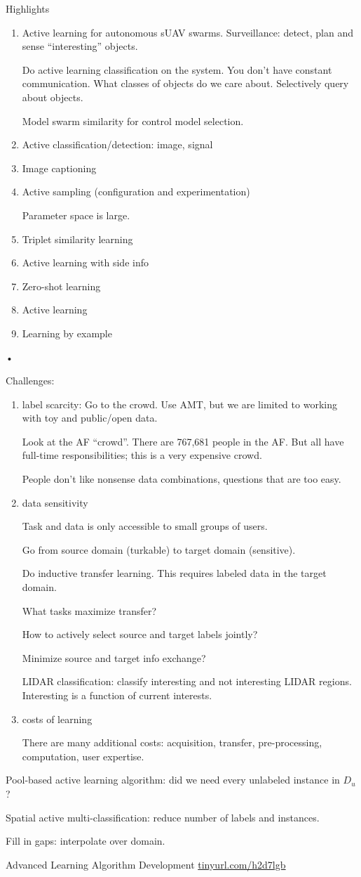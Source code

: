 Highlights
\begin{enumerate}
\item
Active learning for autonomous sUAV swarms. 
Surveillance: detect, plan and sense ``interesting'' objects.

Do active learning classification on the system. You don't have constant communication. What classes of objects do we care about. Selectively query about objects.

Model swarm similarity for control model selection.
\item
Active classification/detection: image, signal
\item
Image captioning
\item
Active sampling (configuration and experimentation)

Parameter space is large. 
\item
Triplet similarity learning
\item
Active learning with side info
\item
Zero-shot learning
\item
Active learning
\item
Learning by example
\end{enumerate}•

Challenges:
\begin{enumerate}
\item
label scarcity: Go to the crowd. Use AMT, but we are limited to working with toy and public/open data.

Look at the AF ``crowd''. There are 767,681 people in the AF. But all have full-time responsibilities; this is a very expensive crowd.

People don't like nonsense data combinations, questions that are too easy.
\item
data sensitivity

Task and data is only accessible to small groups of users.

Go from source domain (turkable) to target domain  (sensitive).

Do inductive transfer learning. This requires labeled data in the target domain. 

What tasks maximize transfer? 

How to actively select source and target labels jointly?

Minimize source and target info exchange?

LIDAR classification: classify interesting and not interesting LIDAR regions. Interesting is a function of current interests.
\item
costs of learning

There are many additional costs: acquisition, transfer, pre-processing, computation, user expertise.
\end{enumerate}
Pool-based active learning algorithm: did we need every unlabeled instance in $D_u$?

Spatial active multi-classification: reduce number of labels and instances. 

Fill in gaps: interpolate over domain.

Advanced Learning Algorithm Development \url{tinyurl.com/h2d7lgb}


